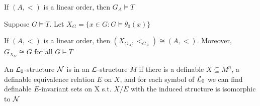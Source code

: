 \documentclass[11pt]{article}
\begin{document}
If \((A,<)\) is a linear order, then \(G_A\models T\)

Suppose \(G\models T\). Let \(X_G=\{x\in G:G\models\theta_0(x)\}\)

\begin{lemma}[]
If \((A,<)\) is a linear order, then \((X_{G_A},<_{G_A})\cong(A,<)\). Moreover,
\(G_{X_G}\cong G\) for all \(G\models T\)
\end{lemma}

\begin{definition}[]
An \(\mathcal{L}_0\)-structure \(\mathcal{N}\) is  in an
\(\mathcal{L}\)-structure \(M\) if there is a definable \(X\subseteq M^n\), a definable
equivalence relation \(E\) on \(X\), and for each symbol of \(\mathcal{L}_0\) we can find
definable \(E\)-invariant sets on X s.t. \(X/E\) with the induced structure is
isomorphic to \(\mathcal{N}\)
\end{definition}
\end{document}
